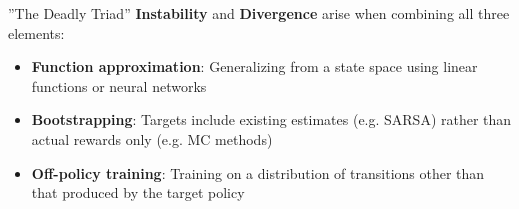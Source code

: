 \documentclass[ignorenonframetext,xcolor=x11names]{beamer}
\begin{document}


\begin{frame}{''The Deadly Triad''}
\textbf{Instability} and \textbf{Divergence} arise when combining all three elements:
\begin{itemize}
\item \textbf{Function approximation}: Generalizing from a state space using linear functions or neural networks
\item \textbf{Bootstrapping}: Targets include existing estimates (e.g. SARSA) rather than actual rewards only (e.g. MC methods)
\item \textbf{Off-policy training}: Training on a distribution of transitions other than that produced by the target policy
\end{itemize}
\end{frame}
\end{document}
